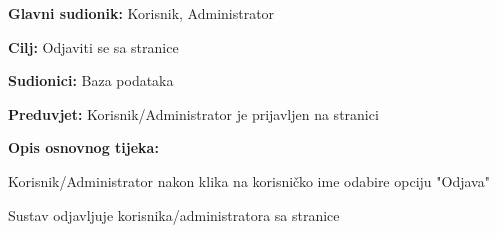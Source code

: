 					\noindent {}
					\begin{packed_item}
	\item \textbf{Glavni sudionik:} Korisnik, Administrator
	\item  \textbf{Cilj:} Odjaviti se sa stranice
	\item  \textbf{Sudionici:} Baza podataka
	\item  \textbf{Preduvjet:} Korisnik/Administrator je prijavljen na stranici
	\item  \textbf{Opis osnovnog tijeka:}
	
	\item[] \begin{packed_enum}
		
		\item Korisnik/Administrator nakon klika na korisničko ime odabire opciju "Odjava"
		\item Sustav odjavljuje korisnika/administratora sa stranice
	\end{packed_enum}

\end{packed_item}


